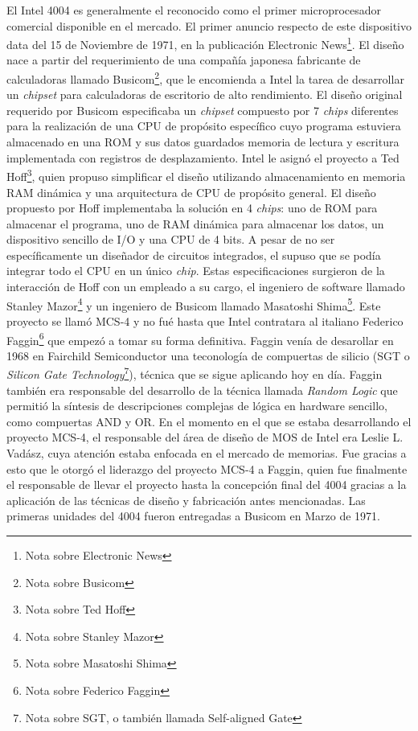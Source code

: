 El Intel 4004 es generalmente el reconocido como el primer microprocesador comercial disponible en el mercado. El primer anuncio respecto de este dispositivo data del 15 de Noviembre de 1971, en la publicación Electronic News\footnote{Nota sobre Electronic News}. El diseño nace a partir del requerimiento de una compañía japonesa fabricante de calculadoras llamado Busicom\footnote{Nota sobre Busicom}, que le encomienda a Intel la tarea de desarrollar un \emph{chipset} para calculadoras de escritorio de alto rendimiento. El diseño original requerido por Busicom especificaba un \emph{chipset} compuesto por 7 \emph{chips} diferentes para la realización de una CPU de propósito específico cuyo programa estuviera almacenado en una ROM y sus datos guardados memoria de lectura y escritura implementada con registros de desplazamiento. Intel le asignó el proyecto a Ted Hoff\footnote{Nota sobre Ted Hoff}, quien propuso simplificar el diseño utilizando almacenamiento en memoria RAM dinámica y una arquitectura de CPU de propósito general. El diseño propuesto por Hoff implementaba la solución en 4 \emph{chips}: uno de ROM para almacenar el programa, uno de RAM dinámica para almacenar los datos, un dispositivo sencillo de I/O y una CPU de 4 bits. A pesar de no ser específicamente un diseñador de circuitos integrados, el supuso que se podía integrar todo el CPU en un único \emph{chip}. Estas especificaciones surgieron de la interacción de Hoff con un empleado a su cargo, el ingeniero de software llamado Stanley Mazor\footnote{Nota sobre Stanley Mazor} y un ingeniero de Busicom llamado Masatoshi Shima\footnote{Nota sobre Masatoshi Shima}. Este proyecto se llamó MCS-4 y no fué hasta que Intel contratara al italiano Federico Faggin\footnote{Nota sobre Federico Faggin} que empezó a tomar su forma definitiva. Faggin venía de desarollar en 1968 en Fairchild Semiconductor una teconología de compuertas de silicio (SGT o \emph{Silicon Gate Technology}\footnote{Nota sobre SGT, o también llamada Self-aligned Gate}), técnica que se sigue aplicando hoy en día. Faggin también era responsable del desarrollo de la técnica llamada \emph{Random Logic} que permitió la síntesis de descripciones complejas de lógica en hardware sencillo, como compuertas AND y OR. En el momento en el que se estaba desarrollando el proyecto MCS-4, el responsable del área de diseño de MOS de Intel era Leslie L. Vadász, cuya atención estaba enfocada en el mercado de memorias. Fue gracias a esto que le otorgó el liderazgo del proyecto MCS-4 a Faggin, quien fue finalmente el responsable de llevar el proyecto hasta la concepción final del 4004 gracias a la aplicación de las técnicas de diseño y fabricación antes mencionadas. Las primeras unidades del 4004 fueron entregadas a Busicom en Marzo de 1971.

